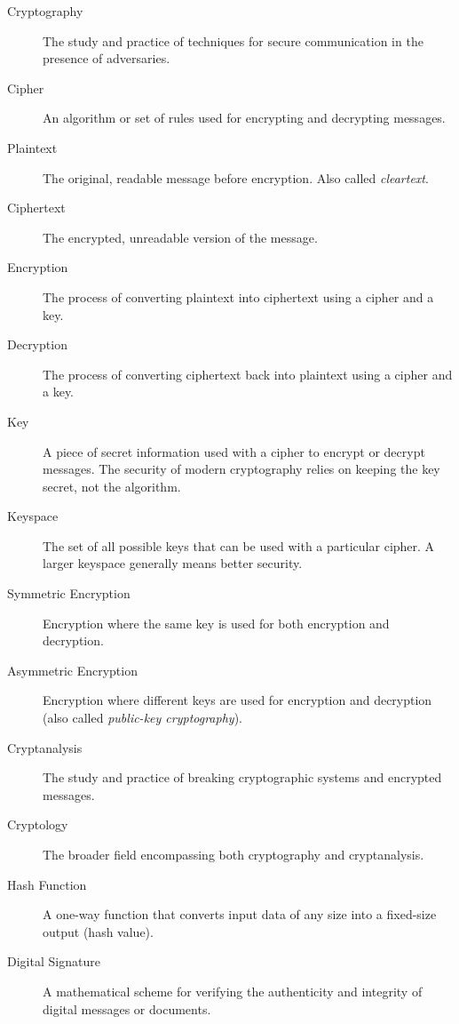 \documentclass[11pt,a4paper]{report}
\begin{document}
\begin{description}
\item[Cryptography] The study and practice of techniques for secure communication in the presence of adversaries.

\item[Cipher] An algorithm or set of rules used for encrypting and decrypting messages.

\item[Plaintext] The original, readable message before encryption. Also called \emph{cleartext}.

\item[Ciphertext] The encrypted, unreadable version of the message.

\item[Encryption] The process of converting plaintext into ciphertext using a cipher and a key.

\item[Decryption] The process of converting ciphertext back into plaintext using a cipher and a key.

\item[Key] A piece of secret information used with a cipher to encrypt or decrypt messages. The security of modern cryptography relies on keeping the key secret, not the algorithm.

\item[Keyspace] The set of all possible keys that can be used with a particular cipher. A larger keyspace generally means better security.

\item[Symmetric Encryption] Encryption where the same key is used for both encryption and decryption.

\item[Asymmetric Encryption] Encryption where different keys are used for encryption and decryption (also called \emph{public-key cryptography}).

\item[Cryptanalysis] The study and practice of breaking cryptographic systems and encrypted messages.

\item[Cryptology] The broader field encompassing both cryptography and cryptanalysis.

\item[Hash Function] A one-way function that converts input data of any size into a fixed-size output (hash value).

\item[Digital Signature] A mathematical scheme for verifying the authenticity and integrity of digital messages or documents.
\end{description}
\end{document}
